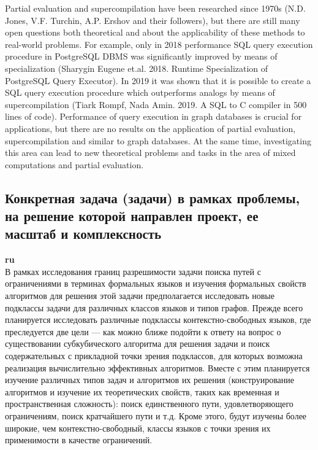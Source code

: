 \documentclass[12pt]{article}  %
\theoremstyle{remark}
\begin{document}
Partial evaluation and supercompilation have been researched since 1970s (N.D. Jones, V.F. Turchin, A.P. Ershov and their followers), but there are still many open questions both theoretical and about the applicability of these methods to real-world problems.
For example, only in 2018 performance SQL query execution procedure in PostgreSQL DBMS was significantly improved by means of specialization (Sharygin Eugene et.al. 2018. Runtime Specialization of PostgreSQL Query Executor).
In 2019 it was shown that it is possible to create a SQL query execution procedure which outperforms analogs by means of supercompilation (Tiark Rompf, Nada Amin. 2019. A SQL to C compiler in 500 lines of code).
Performance of query execution in graph databases is crucial for applications, but there are no results on the application of partial evaluation, supercompilation and similar to graph databases.
At the same time, investigating this area can lead to new theoretical problems and tasks in the area of mixed computations and partial evaluation.

\subsection{Конкретная задача (задачи) в рамках проблемы, на решение которой направлен проект, ее масштаб и комплексность}

\textbf{ru}\\
%
В рамках исследования границ разрешимости задачи поиска путей с ограничениями в терминах формальных языков и изучения формальных свойств алгоритмов для решения этой задачи предполагается исследовать новые подклассы задачи для различных классов языков и типов графов. Прежде всего планируется исследовать различные подклассы контекстно-свободных языков, где преследуется две цели --- как можно ближе подойти к ответу на вопрос о существовании субкубического алгоритма для решения задачи и поиск содержательных с прикладной точки зрения подклассов, для которых возможна реализация вычислительно эффективных алгоритмов. Вместе с этим планируется изучение различных типов задач и алгоритмов их решения (конструирование алгоритмов и изучение их теоретических свойств, таких как временная и пространственная сложность): поиск единственного пути, удовлетворяющего ограничениям, поиск кратчайшего пути и т.д. Кроме этого, будут изучены более широкие, чем контекстно-свободный, классы языков с точки зрения их применимости в качестве ограничений.
\end{document}
